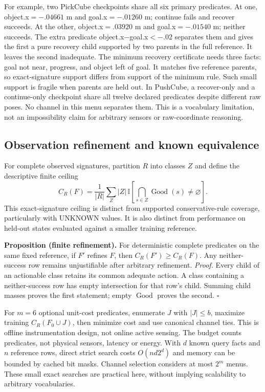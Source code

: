 \documentclass[conference]{IEEEtran}
\newcommand{\Good}{\operatorname{Good}}
\begin{document}
For example, two PickCube checkpoints share all six primary predicates. At one, object.x$=-.04661$ m and goal.x$=-.01260$ m; continue fails and recover succeeds. At the other, object.x$=.03920$ m and goal.x$=-.01540$ m; neither succeeds. The extra predicate object.x$-$goal.x$<-.02$ separates them and gives the first a pure recovery child supported by two parents in the full reference. It leaves the second inadequate. The minimum recovery certificate needs three facts: goal not near, progress, and object left of goal. It matches five reference parents, so exact-signature support differs from support of the minimum rule. Such small support is fragile when parents are held out. In PushCube, a recover-only and a continue-only checkpoint share all twelve declared predicates despite different raw poses. No channel in this menu separates them. This is a vocabulary limitation, not an impossibility claim for arbitrary sensors or raw-coordinate reasoning.

\subsection{Observation refinement and known equivalence}
For complete observed signatures, partition $R$ into classes $Z$ and define the descriptive finite ceiling
\begin{equation}
 C_R(F)=\frac 1{|R|}\sum_Z |Z|\,\mathbb{I}\!\left[\bigcap_{s\in Z}\Good(s)\ne\varnothing\right].
\end{equation}
This exact-signature ceiling is distinct from supported conservative-rule coverage, particularly with UNKNOWN values. It is also distinct from performance on held-out states evaluated against a smaller training reference.

\noindent\textbf{Proposition (finite refinement).} For deterministic complete predicates on the same fixed reference, if $F'$ refines $F$, then $C_R(F')\ge C_R(F)$. Any neither-success row remains unjustifiable after arbitrary refinement.\newline
\emph{Proof.} Every child of an actionable class retains its common adequate action. A class containing a neither-success row has empty intersection for that row's child. Summing child masses proves the first statement; empty $\Good$ proves the second. $\square$

For $m=6$ optional unit-cost predicates, enumerate $J$ with $|J|\le b$, maximize training $C_R(F_0\cup J)$, then minimize cost and use canonical channel ties. This is offline instrumentation design, not online active sensing. The budget counts predicates, not physical sensors, latency or energy. With $d$ known query facts and $n$ reference rows, direct strict search costs $O(n d 2^d)$ and memory can be bounded by cached bit masks. Channel selection considers at most $2^m$ menus. These small exact searches are practical here, without implying scalability to arbitrary vocabularies.
\end{document}
